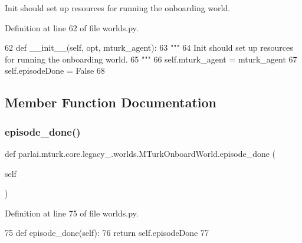 \begin{DoxyVerb}Init should set up resources for running the onboarding world.
\end{DoxyVerb}
 

Definition at line 62 of file worlds.\+py.


\begin{DoxyCode}
62     \textcolor{keyword}{def }\_\_init\_\_(self, opt, mturk\_agent):
63         \textcolor{stringliteral}{"""}
64 \textcolor{stringliteral}{        Init should set up resources for running the onboarding world.}
65 \textcolor{stringliteral}{        """}
66         self.mturk\_agent = mturk\_agent
67         self.episodeDone = \textcolor{keyword}{False}
68 
\end{DoxyCode}


\subsection{Member Function Documentation}
\mbox{\label{classparlai_1_1mturk_1_1core_1_1legacy__2018_1_1worlds_1_1MTurkOnboardWorld_a9cb1072a0d15ae40b90c516c2cdf08cc}} 
\subsubsection{\texorpdfstring{episode\+\_\+done()}{episode\_done()}}
{\footnotesize\ttfamily def parlai.\+mturk.\+core.\+legacy\+\_.\+worlds.\+M\+Turk\+Onboard\+World.\+episode\+\_\+done (\begin{DoxyParamCaption}\item[{}]{self }\end{DoxyParamCaption})}



Definition at line 75 of file worlds.\+py.


\begin{DoxyCode}
75     \textcolor{keyword}{def }episode\_done(self):
76         \textcolor{keywordflow}{return} self.episodeDone
77 
\end{DoxyCode}
\mbox{\label{classparlai_1_1mturk_1_1core_1_1legacy__2018_1_1worlds_1_1MTurkOnboardWorld_a02d2dcac53a40b1c84fa33c15a3f61f1}} 
